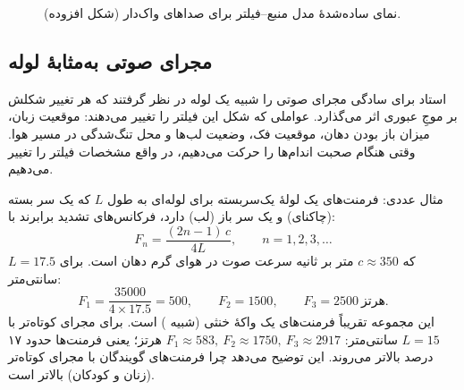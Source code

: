\begin{figure}[htbp]
\centering
{}
\caption{نمای ساده‌شدهٔ مدل منبع--فیلتر برای صداهای واک‌دار (شکل افزوده).}
\end{figure}

\subsection{مجرای صوتی به‌مثابهٔ لوله}
استاد برای سادگی مجرای صوتی را شبیه یک لوله در نظر گرفتند که هر تغییر شکلش بر موجِ عبوری اثر می‌گذارد. عواملی که شکل این فیلتر را تغییر می‌دهند: موقعیت زبان، میزان باز بودن دهان، موقعیت فک، وضعیت لب‌ها و محل تنگ‌شدگی در مسیر هوا. وقتی هنگام صحبت اندام‌ها را حرکت می‌دهیم، در واقع مشخصات فیلتر را تغییر می‌دهیم.


\begin{addedbox}{مثال عددی: فرمنت‌های یک لولهٔ یک‌سر‌بسته}
برای لوله‌ای به طول $L$ که یک سر بسته (چاکنای) و یک سر باز (لب) دارد، فرکانس‌های تشدید برابرند با:
\[
F_n=\frac{(2n-1)\,c}{4L},\qquad n=1,2,3,\dots
\]
که $c\approx 350$ متر بر ثانیه سرعت صوت در هوای گرم دهان است. برای $L=17.5$ سانتی‌متر:
\[
F_1=\frac{35000}{4\times17.5}=500,\qquad F_2=1500,\qquad F_3=2500\ \text{هرتز.}
\]
این مجموعه تقریباً فرمنت‌های یک واکهٔ خنثی (شبیه ) است. برای مجرای کوتاه‌تر با $L=15$ سانتی‌متر: $F_1\approx 583,\ F_2\approx 1750,\ F_3\approx 2917$ هرتز؛ یعنی فرمنت‌ها حدود ۱۷ درصد بالاتر می‌روند. این توضیح می‌دهد چرا فرمنت‌های گویندگان با مجرای کوتاه‌تر (زنان و کودکان) بالاتر است.
\end{addedbox}

